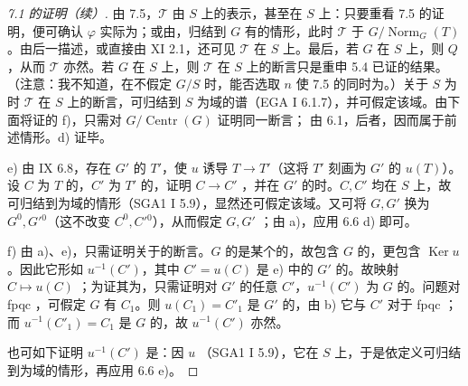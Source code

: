 \begin{proof}[7.1 的证明（续）]
由 7.5，$\mathcal T$ 由 $S$ 上的表示，甚至在 $S$ 上：只要重看 7.5 的证明，便可确认 $\varphi$ 实际为；或由，归结到 $G$ 有的情形，此时 $\mathcal T$ 于 $G/\operatorname{Norm}_G(T)$。由后一描述，或直接由 XI 2.1，还可见 $\mathcal T$ 在 $S$ 上。最后，若 $G$ 在 $S$ 上，则 $Q$，从而 $\mathcal T$ 亦然。若 $G$ 在 $S$ 上，则 $\mathcal T$ 在 $S$ 上的断言只是重申 5.4 已证的结果。（注意：我不知道，在不假定 $G/S$ 时，能否选取 $n$ 使 7.5 的同时为。）关于 $S$ 为时 $\mathcal T$ 在 $S$ 上的断言，可归结到 $S$ 为域的谱（EGA I 6.1.7），并可假定该域。由下面将证的 f)，只需对 $G/\operatorname{Centr}(G)$ 证明同一断言；
由 6.1，后者，因而属于前述情形。d) 证毕。

e) 由 IX 6.8，存在 $G'$ 的 $T'$，使 $u$ 诱导 $T\to T'$（这将 $T'$ 刻画为 $G'$ 的 $u(T)$）。设 $C$ 为 $T$ 的，$C'$ 为 $T'$ 的，证明 $C\to C'$ ，并在 $G'$ 的时。$C,C'$ 均在 $S$ 上，故可归结到为域的情形（SGA1 I 5.9），显然还可假定该域。又可将 $G,G'$ 换为 $G^0,G'{}^0$（这不改变 $C^0,C'{}^0$），从而假定 $G,G'$ ；由 a)，应用 6.6 d) 即可。

f) 由 a)、e)，只需证明关于的断言。$G$ 的是某个的，故包含 $G$ 的，更包含 $\operatorname{Ker}u$。因此它形如 $u^{-1}(C')$，其中 $C'=u(C)$ 是 e) 中的 $G'$ 的。故映射 $C\mapsto u(C)$ ；为证其为，只需证明对 $G'$ 的任意 $C'$，$u^{-1}(C')$ 为 $G$ 的。问题对 fpqc ，可假定 $G$ 有 $C_1$。则 $u(C_1)=C'_1$ 是 $G'$ 的，由 b) 它与 $C'$ 对于 fpqc ；而 $u^{-1}(C'_1)=C_1$ 是 $G$ 的，故 $u^{-1}(C')$ 亦然。

也可如下证明 $u^{-1}(C')$ 是：因 $u$ （SGA1 I 5.9），它在 $S$ 上，于是依定义可归结到为域的情形，再应用 6.6 e)。
\end{proof}
